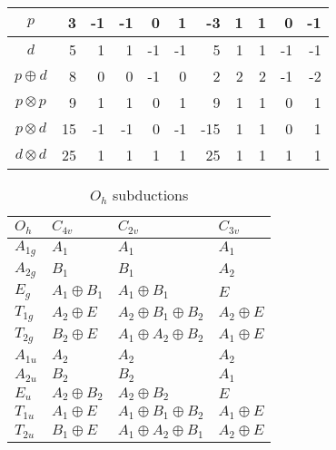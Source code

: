 \documentclass[twocolumn,showpacs,preprintnumbers,superscriptaddress,prb,floatfix,aps,10pt]{revtex4-1}
\begin{document}
\begin{table}
\begin{ruledtabular}
\begin{tabular*}{10cm}{llrrrrrrrrrr}
\multicolumn{2}{c}{$p$          } &  3  &     -1 &    -1  &     0  &     1  &  -3  &          1  &          1  &          0  &         -1  \\
\hline
\multicolumn{2}{c}{$d$          } &  5  &      1 &     1  &    -1  &    -1  &   5  &          1  &          1  &         -1  &         -1  \\
\multicolumn{2}{c}{$p \oplus  d$} &  8  &      0 &     0  &    -1  &     0  &   2  &          2  &          2  &         -1  &         -2  \\
\multicolumn{2}{c}{$p \otimes p$} &  9  &      1 &     1  &     0  &     1  &   9  &          1  &          1  &          0  &          1  \\
\multicolumn{2}{c}{$p \otimes d$} & 15  &     -1 &    -1  &     0  &    -1  & -15  &          1  &          1  &          0  &          1  \\
\multicolumn{2}{c}{$d \otimes d$} & 25  &      1 &     1  &     1  &     1  &  25  &          1  &          1  &          1  &          1  \\
\end{tabular*}
\end{ruledtabular}
\end{table}
%
\begin{table}
\caption{\label{table:subduction} $O_h$ subductions}
\begin{ruledtabular}
\begin{tabular*}{10cm}{llll}
$O_h$    & $C_{4v}$         & $C_{2v}$                              &   $C_{3v}$            \\ \hline
$A_{1g}$ & $A_1$            & $A_{1}$                               &   $A_1$               \\ 
$A_{2g}$ & $B_1$            & $B_{1}$                               &   $A_2$               \\ 
$E_g   $ & $A_1 \oplus B_1$ & $A_{1} \oplus B_{1}$                  &   $E$                 \\ 
$T_{1g}$ & $A_2 \oplus E$   & $A_{2} \oplus B_{1} \oplus B_{2}$     &   $A_2 \oplus E$      \\ 
$T_{2g}$ & $B_2 \oplus E$   & $A_{1} \oplus A_{2} \oplus B_{2}$     &   $A_1 \oplus E$      \\ 
$A_{1u}$ & $A_2$            & $A_{2}$                               &   $A_2$               \\ 
$A_{2u}$ & $B_2$            & $B_{2}$                               &   $A_1$               \\ 
$E_u   $ & $A_2 \oplus B_2$ & $A_{2} \oplus B_{2}$                  &   $E$                 \\ 
$T_{1u}$ & $A_1 \oplus E$   & $A_{1} \oplus B_{1} \oplus B_{2}$     &   $A_1 \oplus E$      \\ 
$T_{2u}$ & $B_1 \oplus E$   & $A_{1} \oplus A_{2} \oplus B_{1}$     &   $A_2 \oplus E$      \\ 
\end{tabular*}
\end{ruledtabular}
\end{table}
\end{document}
